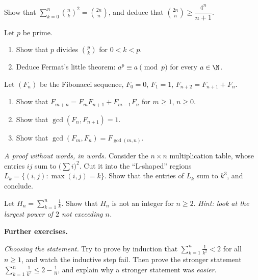 \begin{exercise}[$\star\star$]\label{ex:squares}
Show that $\displaystyle\sum_{k=0}^n\binom nk^2=\binom{2n}n$, and deduce that $\binom{2n}n\ge\dfrac{4^n}{n+1}$.
\end{exercise}

\begin{exercise}[$\star\star$]\label{ex:fermat}
Let $p$ be prime.
\begin{enumerate}[label=(\alph*)]
\item Show that $p$ divides $\binom pk$ for $0<k<p$.
\item Deduce Fermat's little theorem: $a^p\equiv a\pmod p$ for every $a\in\N$.
\end{enumerate}
\end{exercise}

\begin{exercise}[$\star\star$]\label{ex:fibgcd}
Let $(F_n)$ be the Fibonacci sequence, $F_0=0$, $F_1=1$, $F_{n+2}=F_{n+1}+F_n$.
\begin{enumerate}[label=(\alph*)]
\item Show that $F_{m+n}=F_{m}F_{n+1}+F_{m-1}F_n$ for $m\ge1$, $n\ge0$.
\item Show that $\gcd(F_n,F_{n+1})=1$.
\item Show that $\gcd(F_m,F_n)=F_{\gcd(m,n)}$.
\end{enumerate}
\end{exercise}

\begin{exercise}[$\star\star\star$]\label{ex:cubesgeo}
\emph{A proof without words, in words.} Consider the $n\times n$ multiplication table, whose entries
$ij$ sum to $\bigl(\sum i\bigr)^2$. Cut it into the ``L-shaped'' regions
$L_k=\{(i,j):\max(i,j)=k\}$. Show that the entries of $L_k$ sum to $k^3$, and conclude.
\end{exercise}

\begin{exercise}[$\star\star\star$]\label{ex:harmonic}
Let $H_n=\sum_{k=1}^n\frac1k$. Show that $H_n$ is not an integer for $n\ge2$.
\emph{Hint: look at the largest power of $2$ not exceeding $n$.}
\end{exercise}

\medskip\noindent\textbf{Further exercises.}

\begin{exercise}[$\star$]\label{ex:sumsq}
\emph{Choosing the statement.} Try to prove by induction that $\sum_{k=1}^n\frac1{k^2}<2$ for all $n\ge1$, and watch the inductive step fail. Then prove the
stronger statement $\sum_{k=1}^n\frac1{k^2}\le2-\frac1n$, and explain why a stronger statement was \emph{easier}.
\end{exercise}

